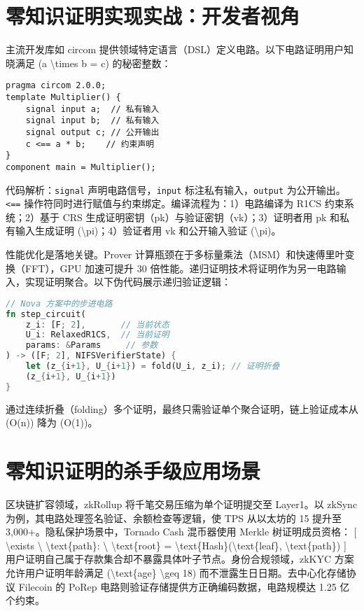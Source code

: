 \chapter{零知识证明实现实战：开发者视角}
主流开发库如 circom 提供领域特定语言（DSL）定义电路。以下电路证明用户知晓满足 (a \textbackslash{}times b = c) 的秘密整数：\par
\begin{lstlisting}[language=circom]
pragma circom 2.0.0;
template Multiplier() {
    signal input a;  // 私有输入
    signal input b;  // 私有输入
    signal output c; // 公开输出
    c <== a * b;    // 约束声明
}
component main = Multiplier();
\end{lstlisting}
代码解析：\texttt{signal} 声明电路信号，\texttt{input} 标注私有输入，\texttt{output} 为公开输出。\texttt{<==} 操作符同时进行赋值与约束绑定。编译流程为：1）电路编译为 R1CS 约束系统；2）基于 CRS 生成证明密钥（pk）与验证密钥（vk）；3）证明者用 pk 和私有输入生成证明 (\textbackslash{}pi)；4）验证者用 vk 和公开输入验证 (\textbackslash{}pi)。\par
性能优化是落地关键。Prover 计算瓶颈在于多标量乘法（MSM）和快速傅里叶变换（FFT），GPU 加速可提升 30 倍性能。递归证明技术将证明作为另一电路输入，实现证明聚合。以下伪代码展示递归验证逻辑：\par
\begin{lstlisting}[language=rust]
// Nova 方案中的步进电路
fn step_circuit(
    z_i: [F; 2],       // 当前状态
    U_i: RelaxedR1CS,  // 当前证明
    params: &Params     // 参数
) -> ([F; 2], NIFSVerifierState) {
    let (z_{i+1}, U_{i+1}) = fold(U_i, z_i); // 证明折叠
    (z_{i+1}, U_{i+1})
}
\end{lstlisting}
通过连续折叠（folding）多个证明，最终只需验证单个聚合证明，链上验证成本从 (O(n)) 降为 (O(1))。\par
\chapter{零知识证明的杀手级应用场景}
区块链扩容领域，zkRollup 将千笔交易压缩为单个证明提交至 Layer1。以 zkSync 为例，其电路处理签名验证、余额检查等逻辑，使 TPS 从以太坊的 15 提升至 3,000+。隐私保护场景中，Tornado Cash 混币器使用 Merkle 树证明成员资格：
[
\textbackslash{}exists \textbackslash{} \textbackslash{}text\{{}path\}{}: \textbackslash{} \textbackslash{}text\{{}root\}{} = \textbackslash{}text\{{}Hash\}{}(\textbackslash{}text\{{}leaf\}{}, \textbackslash{}text\{{}path\}{})
]
用户证明自己属于存款集合却不暴露具体叶子节点。身份合规领域，zkKYC 方案允许用户证明年龄满足 (\textbackslash{}text\{{}age\}{} \textbackslash{}geq 18) 而不泄露生日日期。去中心化存储协议 Filecoin 的 PoRep 电路则验证存储提供方正确编码数据，电路规模达 1.25 亿个约束。\par
